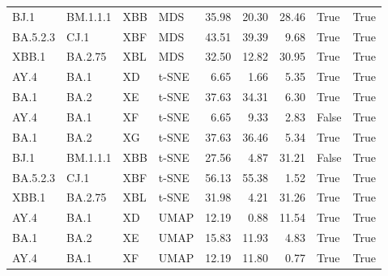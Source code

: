 \begin{tabular}{llllrrrll}
      BJ.1 &   BM.1.1.1 &           XBB &    MDS &         35.98 &         20.30 &         28.46 &                             True &                           True \\
  BA.5.2.3 &       CJ.1 &           XBF &    MDS &         43.51 &         39.39 &          9.68 &                             True &                           True \\
     XBB.1 &    BA.2.75 &           XBL &    MDS &         32.50 &         12.82 &         30.95 &                             True &                           True \\
      AY.4 &       BA.1 &            XD &  t-SNE &          6.65 &          1.66 &          5.35 &                             True &                           True \\
      BA.1 &       BA.2 &            XE &  t-SNE &         37.63 &         34.31 &          6.30 &                             True &                           True \\
      AY.4 &       BA.1 &            XF &  t-SNE &          6.65 &          9.33 &          2.83 &                            False &                           True \\
      BA.1 &       BA.2 &            XG &  t-SNE &         37.63 &         36.46 &          5.34 &                             True &                           True \\
      BJ.1 &   BM.1.1.1 &           XBB &  t-SNE &         27.56 &          4.87 &         31.21 &                            False &                           True \\
  BA.5.2.3 &       CJ.1 &           XBF &  t-SNE &         56.13 &         55.38 &          1.52 &                             True &                           True \\
     XBB.1 &    BA.2.75 &           XBL &  t-SNE &         31.98 &          4.21 &         31.26 &                             True &                           True \\
      AY.4 &       BA.1 &            XD &   UMAP &         12.19 &          0.88 &         11.54 &                             True &                           True \\
      BA.1 &       BA.2 &            XE &   UMAP &         15.83 &         11.93 &          4.83 &                             True &                           True \\
      AY.4 &       BA.1 &            XF &   UMAP &         12.19 &         11.80 &          0.77 &                             True &                           True \\

\end{tabular}
